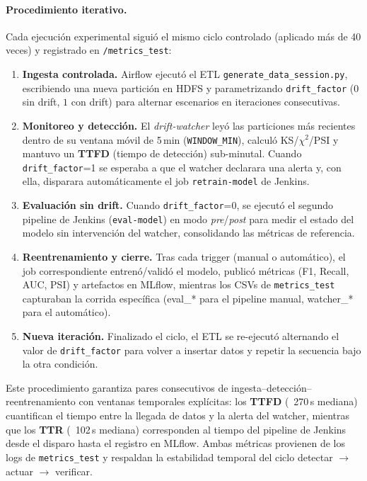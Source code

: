\paragraph{Procedimiento iterativo.}
Cada ejecución experimental siguió el mismo ciclo controlado (aplicado más de 40 veces) y registrado en \texttt{/metrics\_test}:
\begin{enumerate}\setlength\itemsep{1pt}
  \item \textbf{Ingesta controlada.} Airflow ejecutó el ETL \texttt{generate\_data\_session.py}, escribiendo una nueva partición en HDFS y parametrizando \texttt{drift\_factor} ($0$ sin drift, $1$ con drift) para alternar escenarios en iteraciones consecutivas.
  \item \textbf{Monitoreo y detección.} El \textit{drift-watcher} leyó las particiones más recientes dentro de su ventana móvil de 5\,min (\texttt{WINDOW\_MIN}), calculó KS/$\chi^2$/PSI y mantuvo un \textbf{TTFD} (tiempo de detección) sub-minutal. Cuando \texttt{drift\_factor}=1 se esperaba a que el watcher declarara una alerta y, con ella, disparara automáticamente el job \texttt{retrain-model} de Jenkins.
  \item \textbf{Evaluación sin drift.} Cuando \texttt{drift\_factor}=0, se ejecutó el segundo pipeline de Jenkins (\texttt{eval-model}) en modo \textit{pre}/\textit{post} para medir el estado del modelo sin intervención del watcher, consolidando las métricas de referencia.
  \item \textbf{Reentrenamiento y cierre.} Tras cada trigger (manual o automático), el job correspondiente entrenó/validó el modelo, publicó métricas (F1, Recall, AUC, PSI) y artefactos en MLflow, mientras los CSVs de \texttt{metrics\_test} capturaban la corrida específica (eval\_* para el pipeline manual, watcher\_* para el automático).
  \item \textbf{Nueva iteración.} Finalizado el ciclo, el ETL se re-ejecutó alternando el valor de \texttt{drift\_factor} para volver a insertar datos y repetir la secuencia bajo la otra condición.
\end{enumerate}

Este procedimiento garantiza pares consecutivos de ingesta–detección–reentrenamiento con ventanas temporales explícitas: los \textbf{TTFD} (~270\,s mediana) cuantifican el tiempo entre la llegada de datos y la alerta del watcher, mientras que los \textbf{TTR} (~102\,s mediana) corresponden al tiempo del pipeline de Jenkins desde el disparo hasta el registro en MLflow. Ambas métricas provienen de los logs de \texttt{metrics\_test} y respaldan la estabilidad temporal del ciclo detectar $\rightarrow$ actuar $\rightarrow$ verificar.

